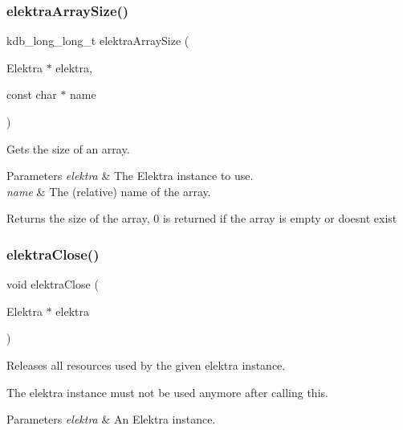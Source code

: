 \subsubsection{\texorpdfstring{elektra\+Array\+Size()}{elektraArraySize()}}
{\footnotesize\ttfamily kdb\+\_\+long\+\_\+long\+\_\+t elektra\+Array\+Size (\begin{DoxyParamCaption}\item[{Elektra $\ast$}]{elektra,  }\item[{const char $\ast$}]{name }\end{DoxyParamCaption})}



Gets the size of an array. 


\begin{DoxyParams}{Parameters}
{\em elektra} & The Elektra instance to use. \\
\hline
{\em name} & The (relative) name of the array. \\
\hline
\end{DoxyParams}
\begin{DoxyReturn}{Returns}
the size of the array, 0 is returned if the array is empty or doesn\textquotesingle{}t exist 
\end{DoxyReturn}
\mbox{\label{group__highlevel_ga9b688b7250e5f9d8ea6701cc2cc269af}} 
\subsubsection{\texorpdfstring{elektra\+Close()}{elektraClose()}}
{\footnotesize\ttfamily void elektra\+Close (\begin{DoxyParamCaption}\item[{Elektra $\ast$}]{elektra }\end{DoxyParamCaption})}



Releases all resources used by the given elektra instance. 

The elektra instance must not be used anymore after calling this. 
\begin{DoxyParams}{Parameters}
{\em elektra} & An Elektra instance. \\
\hline
\end{DoxyParams}
\mbox{\label{group__highlevel_ga22c0775760a9f42f29337c06bf8b2ab5}} 
